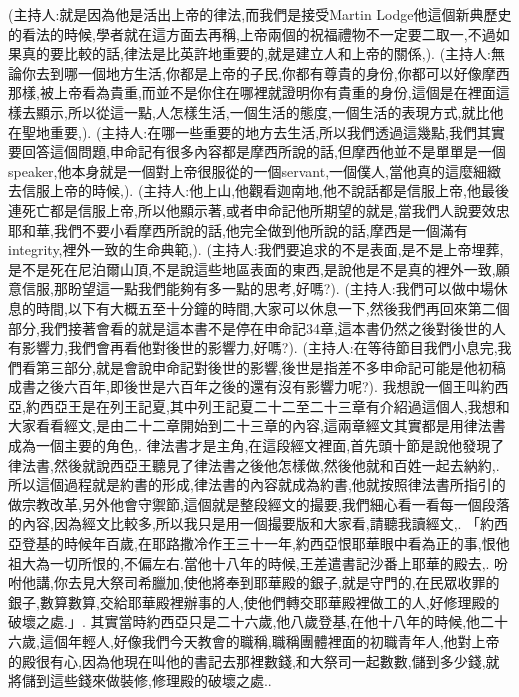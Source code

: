 \documentclass{book}
\begin{document}
(主持人:就是因為他是活出上帝的律法,而我們是接受Martin Lodge他這個新典歷史的看法的時候,學者就在這方面去再稱,上帝兩個的祝福禮物不一定要二取一,不過如果真的要比較的話,律法是比英許地重要的,就是建立人和上帝的關係,).
(主持人:無論你去到哪一個地方生活,你都是上帝的子民,你都有尊貴的身份,你都可以好像摩西那樣,被上帝看為貴重,而並不是你住在哪裡就證明你有貴重的身份,這個是在裡面這樣去顯示,所以從這一點,人怎樣生活,一個生活的態度,一個生活的表現方式,就比他在聖地重要,).
(主持人:在哪一些重要的地方去生活,所以我們透過這幾點,我們其實要回答這個問題,申命記有很多內容都是摩西所說的話,但摩西他並不是單單是一個speaker,他本身就是一個對上帝很服從的一個servant,一個僕人,當他真的這麼細緻去信服上帝的時候,).
(主持人:他上山,他觀看迦南地,他不說話都是信服上帝,他最後連死亡都是信服上帝,所以他顯示著,或者申命記他所期望的就是,當我們人說要效忠耶和華,我們不要小看摩西所說的話,他完全做到他所說的話,摩西是一個滿有integrity,裡外一致的生命典範,).
(主持人:我們要追求的不是表面,是不是上帝埋葬,是不是死在尼泊爾山頂,不是說這些地區表面的東西,是說他是不是真的裡外一致,願意信服,那盼望這一點我們能夠有多一點的思考,好嗎?).
(主持人:我們可以做中場休息的時間,以下有大概五至十分鐘的時間,大家可以休息一下,然後我們再回來第二個部分,我們接著會看的就是這本書不是停在申命記34章,這本書仍然之後對後世的人有影響力,我們會再看他對後世的影響力,好嗎?).
(主持人:在等待節目我們小息完,我們看第三部分,就是會說申命記對後世的影響,後世是指差不多申命記可能是他初稿成書之後六百年,即後世是六百年之後的還有沒有影響力呢?).
我想說一個王叫約西亞,約西亞王是在列王記夏,其中列王記夏二十二至二十三章有介紹過這個人,我想和大家看看經文,是由二十二章開始到二十三章的內容,這兩章經文其實都是用律法書成為一個主要的角色,.
律法書才是主角,在這段經文裡面,首先頭十節是說他發現了律法書,然後就說西亞王聽見了律法書之後他怎樣做,然後他就和百姓一起去納約,.
所以這個過程就是約書的形成,律法書的內容就成為約書,他就按照律法書所指引的做宗教改革,另外他會守禦節,這個就是整段經文的撮要,我們細心看一看每一個段落的內容,因為經文比較多,所以我只是用一個撮要版和大家看,請聽我讀經文,.
「約西亞登基的時候年百歲,在耶路撒冷作王三十一年,約西亞恨耶華眼中看為正的事,恨他祖大為一切所恨的,不偏左右.當他十八年的時候,王差遣書記沙番上耶華的殿去,.
吩咐他講,你去見大祭司希臘加,使他將奉到耶華殿的銀子,就是守門的,在民眾收罪的銀子,數算數算,交給耶華殿裡辦事的人,使他們轉交耶華殿裡做工的人,好修理殿的破壞之處.」.
其實當時約西亞只是二十六歲,他八歲登基,在他十八年的時候,他二十六歲,這個年輕人,好像我們今天教會的職稱,職稱團體裡面的初職青年人,他對上帝的殿很有心,因為他現在叫他的書記去那裡數錢,和大祭司一起數數,儲到多少錢,就將儲到這些錢來做裝修,修理殿的破壞之處..
\end{document}
